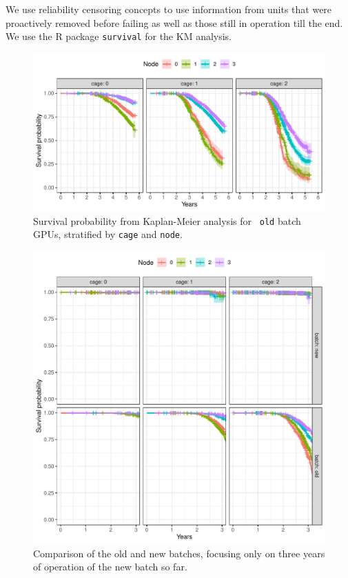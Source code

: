 We use reliability censoring concepts to use information from units
that were proactively removed before failing as well as those still in
operation till the end. We use the R package {\tt survival} for the KM
analysis.
\begin{figure}
  \centering
  \includegraphics[width=6in]{figs/km_cage-node_o001.pdf}
  \caption{Survival probability from Kaplan-Meier analysis for {\tt
      old} batch GPUs, stratified by {\tt cage} and {\tt node}.}
  \label{fig:km-old-cage-node}
\end{figure}
\begin{figure}
  \centering
  \includegraphics[width=6in]{figs/km_cage-node_c001.pdf}
  \caption{Comparison of the old and new batches, focusing only on
    three years of operation of the new batch so far.}
  \label{fig:km-all-cage-node}
\end{figure}

